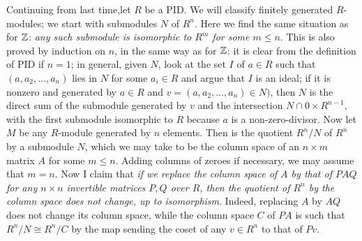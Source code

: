 Continuing from last time,let $R$ be a PID.  We will classify finitely generated $R$-modules; we start with submodules $N$ of $R^n$.  Here we find the same situation as for $\Bbb Z$:  {\sl any such submodule is isomorphic to $R^m$ for some $m\le n$}.  This is also proved by induction on $n$, in the same way as for $\Bbb Z$:  it is clear from the definition of PID if $n=1$; in general, given $N$, look at the set $I$ of $a\in R$ such that $(a,a_2,\ldots,a_n)$ lies in $N$ for some $a_i\in R$ and argue that $I$ is an ideal; if it is nonzero and generated by $a\in R$ and $v=(a,a_2,\ldots,a_n)\in N)$, then $N$ is the direct sum of the submodule generated by $v$ and the intersection $N\cap 0\times R^{n-1}$, with the first submodule isomorphic to $R$ because $a$ is a non-zero-divisor.  Now let $M$ be any $R$-module generated by $n$ elements.  Then is the quotient $R^n/N$ of $R^n$ by a submodule $N$, which we may take to be the column space of an $n\times m$ matrix $A$ for some $m\le n$.  Adding columns of zeroes if necessary, we may assume that $m=n$.  Now I claim that {\sl if we replace the column space of $A$ by that of $PAQ$ for any  $n\times n$ invertible matrices $P,Q$ over $R$, then the quotient of $R^n$ by the column space does not change, up to isomorphism}.  Indeed, replacing $A$ by $AQ$ does not change its column space, while the column space $C$ of $PA$ is such that $R^n/N\cong R^n/C$ by the map sending the coset of any $v\in R^n$ to that of
$Pv$.  

